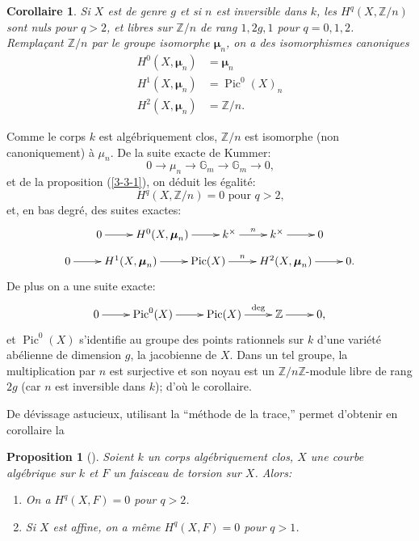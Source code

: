 \documentclass{article}
\DeclareMathOperator{\pic}{Pic}
\newcommand{\dG}{\mathbb{G}}
\newcommand{\dmu}{\boldsymbol{\mu}}
\newcommand{\dZ}{\mathbb{Z}}
\newtheorem{proposition}[subsubsection]{Proposition}
\newtheorem{corollary}[subsubsection]{Corollaire}
\begin{document}
\begin{corollary}\label{3-3-5}
Si $X$ est de genre $g$ et si $n$ est inversible dans $k$, les 
$H^q(X,\dZ/n)$ sont nuls pour $q>2$, et libres sur $\dZ/n$ de rang $1,2 g,1$ 
pour $q=0,1,2$. Remplaçant $\dZ/n$ par le groupe isomorphe $\dmu_n$, on a des 
isomorphismes canoniques 
\begin{align*}
  H^0(X,\dmu_n) &= \dmu_n \\
  H^1(X,\dmu_n) &= \pic^0(X)_n \\
  H^2(X,\dmu_n) &= \dZ/n \text{.}
\end{align*}
\end{corollary}

Comme le corps $k$ est algébriquement clos, $\dZ/n$ est isomorphe (non 
canoniquement) à $\mu_n$. De la suite exacte de Kummer:
\[
  0 \to \mu_n \to \dG_m \to \dG_m \to 0\text{,}
\]
et de la proposition (\ref{3-3-1}), on déduit les égalité:
\[
  H^q(X,\dZ/n) = 0 \text{ pour $q>2$,}
\]
et, en bas degré, des suites exactes:
\[\xymatrix{
  0 \ar[r] 
    & H^0(X,\dmu_n) \ar[r] 
    & k^\times \ar[r]^-n 
    & k^\times \ar[r] 
    & 0
}\]
\[\xymatrix{
  0 \ar[r] 
    & H^1(X,\dmu_n) \ar[r] 
    & \pic(X) \ar[r]^-n 
    & H^2(X,\dmu_n) \ar[r] 
    & 0\text{.}
}\]
De plus on a une suite exacte:
\[\xymatrix{
  0 \ar[r] 
    & \pic^0(X) \ar[r] 
    & \pic(X) \ar[r]^-{\deg}
    & \dZ \ar[r] 
    & 0 \text{,}
}\]
et $\pic^0(X)$ s'identifie au groupe des points rationnels sur $k$ d'une 
variété abélienne de dimension $g$, la jacobienne de $X$. Dans un tel 
groupe, la multiplication par $n$ est surjective et son noyau est un 
$\dZ/n\dZ$-module libre de rang $2 g$ (car $n$ est inversible dans $k$); d'où 
le corollaire. 

De dévissage astucieux, utilisant la ``méthode de la trace,'' permet 
d'obtenir en corollaire la 





\begin{proposition}[{\cite[IX 5.7]{4}}]\label{3-3-6}
Soient $k$ un corps algébriquement clos, $X$ une courbe algébrique sur $k$ 
et $F$ un faisceau de torsion sur $X$. Alors:
\begin{enumerate}[\indent i)]
  \item On a $H^q(X,F) = 0$ pour $q>2$.
  \item Si $X$ est affine, on a même $H^q(X,F) = 0$ pour $q>1$.
\end{enumerate}
\end{proposition}
\end{document}
